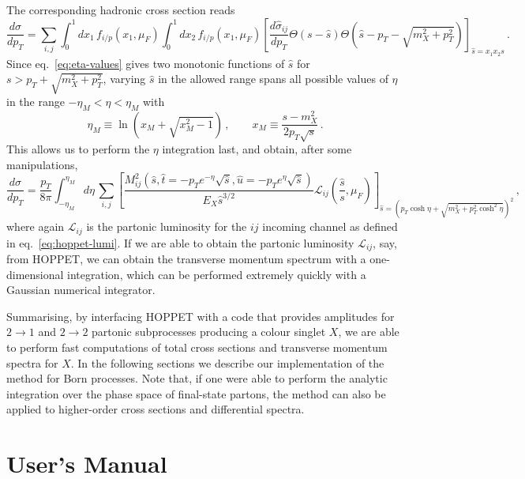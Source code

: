 \documentclass[12pt]{article}
\begin{document}
The corresponding hadronic cross section reads
\begin{equation}
\label{eq:hadronic-pt}
  \frac{d\sigma}{dp_T} = \sum_{i,j} \int_0^1 dx_1\, f_{i/p}(x_1,\mu_F)\int_0^1 dx_2 \, f_{i/p}(x_1,\mu_F) \left[\frac{d\hat \sigma_{ij}}{dp_T} \Theta(s-\hat s) \Theta\left(\hat s-p_T-\sqrt{m_X^2+p^2_T}\right)  \right]_{\hat s=x_1x_2 s}\,.
\end{equation}
Since eq.~\eqref{eq:eta-values} gives two monotonic functions of $\hat s$ for $s>p_T+\sqrt{m_X^2+p^2_T}$, varying $\hat s$ in the allowed range spans all possible values of $\eta$ in the range $-\eta_M<\eta<\eta_M$ with
\begin{equation}
\label{eq:eta-range}
\eta_M \equiv \ln(x_M + \sqrt{x_M^2-1})\,,\qquad  x_M\equiv\frac{s-m_X^2}{2 p_T \sqrt{s} }\,.
\end{equation}
This allows us to perform the  $\eta$ integration last, and obtain, after some
manipulations,
\begin{equation}
\label{eq:hadronic-pt-lumi}
  \frac{d\sigma}{dp_T} = \frac{p_T}{8 \pi}\int_{-\eta_M}^{\eta_M}\!d\eta\, \sum_{i,j}  \left[\frac{M^2_{ij}\left(\hat s,\hat t=-p_T e^{-\eta}\sqrt {\hat s}  ,\hat u =- p_T e^{\eta}\sqrt{\hat s}\right)}{E_X \hat s^{3/2}}\mathcal{L}_{ij}\left(\frac{\hat s}{s},\mu_F\right) \right]_{\hat s=\left(p_T\cosh\eta+\sqrt{m_X^2+p^2_T\cosh^2\eta}\right)^2}\,,
\end{equation}
where again $\mathcal{L}_{ij}$ is the partonic luminosity for the $ij$
incoming channel as defined in eq.~\eqref{eq:hoppet-lumi}. If we are
able to obtain the partonic luminosity $\mathcal{L}_{ij}$, say, from
\textsc{HOPPET}, we can obtain the transverse momentum spectrum with a
one-dimensional integration, which can be performed extremely quickly
with a Gaussian numerical integrator.

Summarising, by interfacing \textsc{HOPPET} with a code that provides
amplitudes for $2\to 1$ and $2\to 2$ partonic subprocesses producing a
colour singlet $X$, we are able to perform fast computations of total
cross sections and transverse momentum spectra for $X$. In the
following sections we describe our implementation of the method for
Born processes. Note that, if one were able to perform the analytic
integration over the phase space of final-state partons, the method
can also be applied to higher-order cross sections and differential
spectra.

\section{User's Manual}
\label{sec:manual} 
\end{document}
